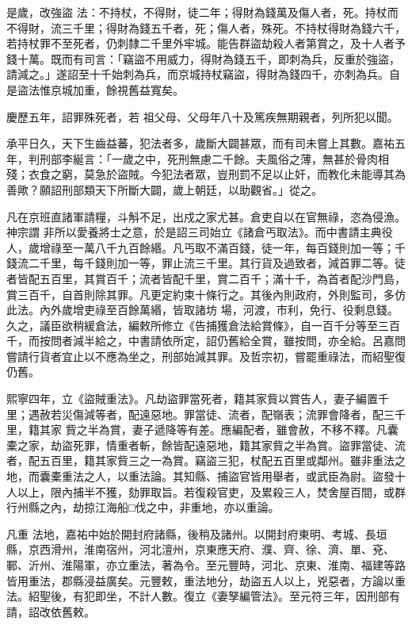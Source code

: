 \begin{pinyinscope}
 是歲，改強盜
 法：不持杖，不得財，徒二年；得財為錢萬及傷人者，死。持杖而不得財，流三千里；得財為錢五千者，死；傷人者，殊死。不持杖得財為錢六千，若持杖罪不至死者，仍刺隸二千里外牢城。能告群盜劫殺人者第賞之，及十人者予錢十萬。既而有司言：「竊盜不用威力，得財為錢五千，即刺為兵，反重於強盜，請減之。」遂詔至十千始刺為兵，而京城持杖竊盜，得財為錢四千，亦刺為兵。自是盜法惟京城加重，餘視舊益寬矣。



 慶歷五年，詔罪殊死者，若
 祖父母、父母年八十及篤疾無期親者，列所犯以聞。



 承平日久，天下生齒益蕃，犯法者多，歲斷大闢甚眾，而有司未嘗上其數。嘉祐五年，判刑部李綖言：「一歲之中，死刑無慮二千餘。夫風俗之薄，無甚於骨肉相殘；衣食之窮，莫急於盜賊。今犯法者眾，豈刑罰不足以止奸，而教化未能導其為善歟？願詔刑部類天下所斷大闢，歲上朝廷，以助觀省。」從之。



 凡在京班直諸軍請糧，斗斛不足，出戍之家尤甚。倉吏自以在官無祿，恣為侵漁。神宗謂
 非所以愛養將士之意，於是詔三司始立《諸倉丐取法》。而中書請主典役人，歲增祿至一萬八千九百餘緡。凡丐取不滿百錢，徒一年，每百錢則加一等；千錢流二千里，每千錢則加一等，罪止流三千里。其行貨及過致者，減首罪二等。徒者皆配五百里，其賞百千；流者皆配千里，賞二百千；滿十千，為首者配沙門島，賞三百千，自首則除其罪。凡更定約束十條行之。其後內則政府，外則監司，多仿此法。內外歲增吏祿至百餘萬緡，皆取諸坊
 場，河渡，市利，免行、役剩息錢。久之，議臣欲稍緩倉法，編敕所修立《告捕獲倉法給賞條》，自一百千分等至三百千，而按問者減半給之，中書請依所定，詔仍舊給全賞，雖按問，亦全給。呂嘉問嘗請行貨者宜止以不應為坐之，刑部始減其罪。及哲宗初，嘗罷重祿法，而紹聖復仍舊。



 熙寧四年，立《盜賊重法》。凡劫盜罪當死者，籍其家貲以賞告人，妻子編置千里；遇赦若災傷減等者，配遠惡地。罪當徒、流者，配嶺表；流罪會降者，配三千里，籍其家
 貲之半為賞，妻子遞降等有差。應編配者，雖會赦，不移不釋。凡囊橐之家，劫盜死罪，情重者斬，餘皆配遠惡地，籍其家貲之半為賞。盜罪當徒、流者，配五百里，籍其家貲三之一為賞。竊盜三犯，杖配五百里或鄰州。雖非重法之地，而囊橐重法之人，以重法論。其知縣、捕盜官皆用舉者，或武臣為尉。盜發十人以上，限內捕半不獲，劾罪取旨。若復殺官吏，及累殺三人，焚舍屋百間，或群行州縣之內，劫掠江海船□伐之中，非重地，亦以重論。



 凡重
 法地，嘉祐中始於開封府諸縣，後稍及諸州。以開封府東明、考城、長垣縣，京西滑州，淮南宿州，河北澶州，京東應天府、濮、齊、徐、濟、單、兗、鄆、沂州、淮陽軍，亦立重法，著為令。至元豐時，河北、京東、淮南、福建等路皆用重法，郡縣浸益廣矣。元豐敕，重法地分，劫盜五人以上，兇惡者，方論以重法。紹聖後，有犯即坐，不計人數。復立《妻孥編管法》。至元符三年，因刑部有請，詔改依舊敕。




\end{pinyinscope}
